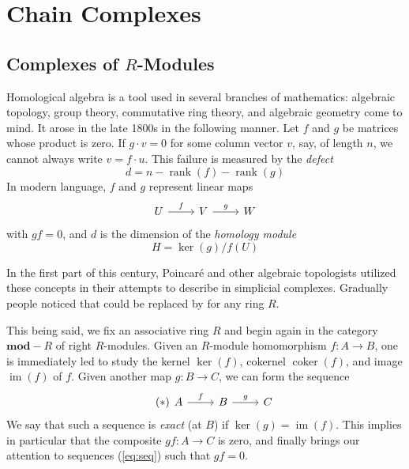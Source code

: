 \section{Chain Complexes}

\subsection{Complexes of $R$-Modules}

Homological algebra is a tool used in several branches of mathematics: algebraic topology, group theory, commutative ring theory, and algebraic geometry come to mind. It arose in the late 1800s in the following manner. Let $f$ and $g$ be matrices whose product is zero. If $g \cdot v = 0$ for some column vector $v$, say, of length $n$, we cannot always write $v = f \cdot u$. This failure is measured by the \emph{defect}
\[
  d = n - \operatorname{rank}(f) - \operatorname{rank}(g)
\]
In modern language, $f$ and $g$ represent linear maps
\begin{equation*}
  \begin{tikzcd}
    U \ar[r, "f"] & V \ar[r, "g"] & W
  \end{tikzcd}
\end{equation*}
with $gf = 0$, and $d$ is the dimension of the \emph{homology module}
\[
  H = \ker(g) / f(U)
\]

In the first part of this century, Poincaré and other algebraic topologists utilized these concepts in their attempts to describe  in simplicial complexes. Gradually people noticed that  could be replaced by  for any ring $R$.

This being said, we fix an associative ring $R$ and begin again in the category $\mathbf{mod}\!\!-\!\!R$ of right $R$-modules. Given an $R$-module homomorphism $f : A \to B$, one is immediately led to study the kernel $\ker(f)$, cokernel $\operatorname{coker}(f)$, and image $\operatorname{im}(f)$ of $f$. Given another map $g : B \to C$, we can form the sequence
\begin{equation}
  \tag{$\ast$}
  \label{eq:seq}
  \begin{tikzcd}
    A \ar[r, "f"] & B \ar[r, "g"] & C
  \end{tikzcd}
\end{equation}
We say that such a sequence is \emph{exact} (at $B$) if $\ker(g) = \operatorname{im}(f)$. This implies in particular that the composite $gf : A \to C$ is zero, and finally brings our attention to sequences (\ref{eq:seq}) such that $gf = 0$.

